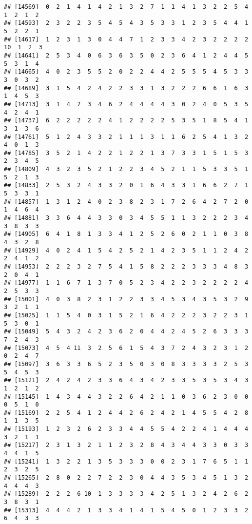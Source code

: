 \documentclass[
]{article}
\begin{document}
\begin{verbatim}
## [14569]  0  2  1  4  1  4  2  1  3  2  7  1  1  4  1  3  2  2  5  4  1  2  1  2
## [14593]  2  3  2  2  3  5  4  5  4  3  5  3  3  1  2  3  5  4  4  1  5  2  2  1
## [14617]  1  2  3  1  3  0  4  4  7  1  2  3  3  4  2  3  2  2  2  2 10  1  2  3
## [14641]  2  5  3  4  0  6  3  6  3  5  0  2  3  6  4  1  2  4  4  5  5  3  1  4
## [14665]  4  0  2  3  5  5  2  0  2  2  4  4  2  5  5  5  4  5  3  3  3  0  3  2
## [14689]  3  1  5  4  2  4  2  2  3  3  1  3  2  2  2  6  6  1  6  3  1  4  5  3
## [14713]  3  1  4  7  3  4  6  2  4  4  4  4  3  0  2  4  0  5  3  5  4  2  4  1
## [14737]  6  2  2  2  2  2  4  1  2  2  2  2  5  3  5  1  8  5  4  1  3  1  3  6
## [14761]  5  1  2  4  3  3  2  1  1  1  3  1  1  6  2  5  4  1  3  2  4  0  1  3
## [14785]  3  5  2  1  4  2  2  1  2  2  1  3  7  3  3  1  5  1  5  3  2  3  4  5
## [14809]  4  3  2  3  5  2  1  2  2  3  4  5  2  1  1  5  3  3  5  1  5  2  1  3
## [14833]  2  5  3  2  4  3  3  2  0  1  6  4  3  3  1  6  6  2  7  1  5  3  3  1
## [14857]  1  3  1  2  4  0  2  3  8  2  3  1  7  2  6  4  2  7  2  0  1  4  6  4
## [14881]  3  3  6  4  4  3  3  0  3  4  5  5  1  1  3  2  2  2  3  4  3  8  3  3
## [14905]  6  4  1  8  1  3  3  4  1  2  5  2  6  0  2  1  1  0  3  8  4  3  2  8
## [14929]  4  0  2  4  1  5  4  2  5  2  1  4  2  3  5  1  1  2  4  2  2  4  1  2
## [14953]  2  2  2  3  2  7  5  4  1  5  8  2  2  2  3  3  3  4  8  3  2  0  4  1
## [14977]  1  1  6  7  1  3  7  0  5  2  3  4  2  2  3  2  2  2  2  4  2  5  3  3
## [15001]  4  0  3  8  2  3  1  2  2  3  3  4  5  3  4  3  5  3  2  9  3  2  1  1
## [15025]  1  1  5  4  0  3  1  5  2  1  6  4  2  2  2  3  2  2  3  1  5  3  0  1
## [15049]  5  4  3  2  4  2  3  6  2  0  4  4  2  4  5  2  6  3  3  3  7  2  4  3
## [15073]  4  5  4 11  3  2  5  6  1  5  4  3  7  2  4  3  2  3  1  2  0  2  4  7
## [15097]  3  6  3  3  6  5  2  3  5  0  3  0  8  3  3  3  3  2  5  3  5  4  5  3
## [15121]  2  4  2  4  2  3  3  6  4  3  4  2  3  3  5  3  5  3  4  3  1  2  1  2
## [15145]  1  4  3  4  4  3  2  2  6  4  2  1  1  0  3  6  2  3  0  0  0  5  1  0
## [15169]  2  2  5  4  1  2  4  4  2  6  2  4  2  1  4  5  5  4  2  8  1  1  3  5
## [15193]  1  2  3  2  6  2  3  3  4  4  5  5  4  2  2  4  1  4  4  4  3  2  1  1
## [15217]  2  3  1  3  2  1  1  2  3  2  8  4  3  4  4  3  3  0  3  3  4  4  1  5
## [15241]  1  3  2  2  1  3  5  3  3  3  0  0  2  3  1  7  6  5  1  1  2  3  2  5
## [15265]  2  8  0  2  2  7  2  2  3  0  4  4  3  5  3  4  5  1  3  2  4  4  4  3
## [15289]  2  2  2  6 10  1  3  3  3  3  4  2  5  1  3  2  4  2  6  2  3  8  3  1
## [15313]  4  4  4  2  1  3  3  4  1  4  1  5  4  5  0  1  2  3  3  2  6  4  3  3

\end{verbatim}
\end{document}

